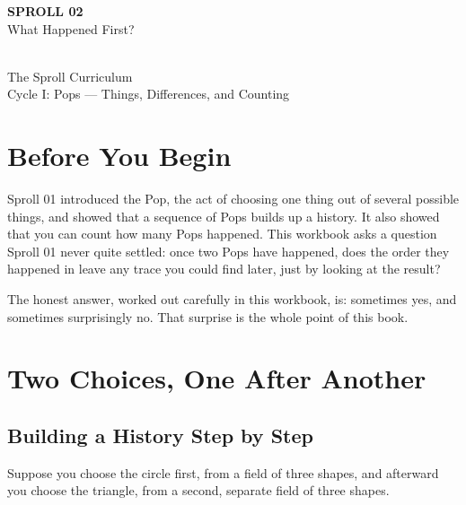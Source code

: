 \documentclass[11pt]{book}
\begin{document}
\begin{titlepage}
\centering
\vspace*{1.4in}
{\Huge \textbf{SPROLL 02}}\\[0.5in]
{\huge What Happened First?}\\[0.8in]
\\[0.8in]
{\Large The Sproll Curriculum}\\[0.2in]
{\large Cycle I: Pops --- Things, Differences, and Counting}
\end{titlepage}

\tableofcontents

\chapter*{Before You Begin}

Sproll 01 introduced the Pop, the act of choosing one thing out of several possible things, and showed that a sequence of Pops builds up a history. It also showed that you can count how many Pops happened. This workbook asks a question Sproll 01 never quite settled: once two Pops have happened, does the order they happened in leave any trace you could find later, just by looking at the result?

The honest answer, worked out carefully in this workbook, is: sometimes yes, and sometimes surprisingly no. That surprise is the whole point of this book.

\chapter{Two Choices, One After Another}

\section{Building a History Step by Step}

Suppose you choose the circle first, from a field of three shapes, and afterward you choose the triangle, from a second, separate field of three shapes.

\begin{center}
\end{center}
\end{document}
